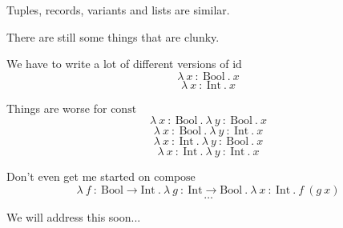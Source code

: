 \begin{frame}
  Tuples, records, variants and lists are similar.
\end{frame}

\begin{frame}
  There are still some things that are clunky.
\end{frame}

\begin{frame}
  We have to write a lot of different versions of $\text{id}$
  \[ \lambda~x~{:}~\text{Bool}~.~x \]
  \[ \lambda~x~{:}~\text{Int}~.~x \]
\end{frame}

\begin{frame}
  Things are worse for $\text{const}$
  \[ \lambda~x~{:}~\text{Bool}~.~\lambda~y~{:}~\text{Bool}~.~x \]
  \[ \lambda~x~{:}~\text{Bool}~.~\lambda~y~{:}~\text{Int}~.~x \]
  \[ \lambda~x~{:}~\text{Int}~.~\lambda~y~{:}~\text{Bool}~.~x \]
  \[ \lambda~x~{:}~\text{Int}~.~\lambda~y~{:}~\text{Int}~.~x \]
\end{frame}

\begin{frame}
  Don't even get me started on $\text{compose}$
  \[
    \lambda~f~{:}~\text{Bool}\rightarrow\text{Int}~.~\lambda~g~{:}~\text{Int}\rightarrow\text{Bool}~.~\lambda~x~{:}~\text{Int}~.~f~\left(g~x \right) \]
  \[\ldots\]
\end{frame}

\begin{frame}
  We will address this soon...
\end{frame}
